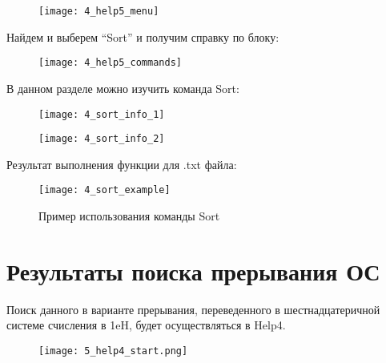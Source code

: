 \begin{figure}[H]
  \begin{center}
    \texttt{[image: 4\_help5\_menu]}
    \caption{}
    \label{pic:pic_name}
  \end{center}
\end{figure}

Найдем и выберем “Sort” и получим справку по блоку:

\begin{figure}[H]
  \begin{center}
    \texttt{[image: 4\_help5\_commands]}
    \caption{}
    \label{pic:pic_name}
  \end{center}
\end{figure}

В данном разделе можно изучить команда Sort:

\begin{figure}[H]
  \begin{center}
    \texttt{[image: 4\_sort\_info\_1]}
    \caption{}
    \label{pic:pic_name}
  \end{center}
\end{figure}

\begin{figure}[H]
  \begin{center}
    \texttt{[image: 4\_sort\_info\_2]}
    \caption{}
    \label{pic:pic_name}
  \end{center}
\end{figure}

Результат выполнения функции для .txt файла:

\begin{figure}[H]
  \begin{center}
    \texttt{[image: 4\_sort\_example]}
    \caption{Пример использования команды Sort}
    \label{pic:pic_name}
  \end{center}
\end{figure}

\section{Результаты поиска прерывания ОС}

Поиск данного в варианте прерывания, переведенного в шестнадцатеричной системе счисления в 1eH, будет осуществляться в Help4.
\begin{figure}[H]
  \begin{center}
    \texttt{[image: 5\_help4\_start.png]}
    \caption{}
    \label{pic:pic_name}
  \end{center}
\end{figure}


